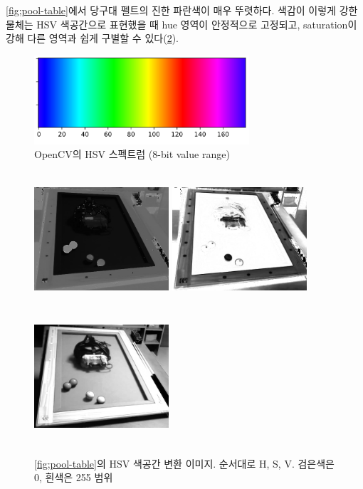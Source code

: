 \documentclass[10pt]{oblivoir}
\begin{document}
\cref{fig;pool-table}에서 당구대 펠트의 진한 파란색이 매우 뚜렷하다. 색감이 이렇게 강한 물체는 HSV 색공간으로 표현했을 때  hue 영역이 안정적으로 고정되고, saturation이 강해 다른 영역과 쉽게 구별할 수 있다(\cref{fig;pool-table-hs}).

\begin{figure}[ht]
    \centering
    \includegraphics[width=8cm]{img/hsv-spectrum.png}
    \caption{OpenCV의 HSV 스펙트럼 (8-bit value range)}
    \label{fig;hsv-spectrum}
\end{figure}

\begin{figure}[ht]
    \centering
    \includegraphics[width=5cm, height=5cm, keepaspectratio]{img/billiards-table-h-shift.png}
    \includegraphics[width=5cm, height=5cm, keepaspectratio]{img/billiards-table-s.png}
    \includegraphics[width=5cm, height=5cm, keepaspectratio]{img/billiards-table-v.png}
    \caption[Caption for LOF]{\cref{fig;pool-table}의 HSV 색공간 변환 이미지. 순서대로 H\footnotemark, S, V. 검은색은 0, 흰색은 255 범위}
    \label{fig;pool-table-hs}
\end{figure}
\end{document}
